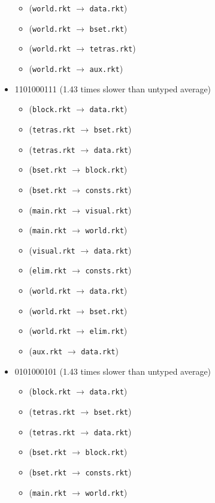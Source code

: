 \documentclass{article}
\newcommand{\mono}[1]{\texttt{#1}}
\begin{document}
\begin{itemize}
\begin{itemize}
  \item (\mono{world.rkt} $\rightarrow$ \mono{data.rkt})
  \item (\mono{world.rkt} $\rightarrow$ \mono{bset.rkt})
  \item (\mono{world.rkt} $\rightarrow$ \mono{tetras.rkt})
  \item (\mono{world.rkt} $\rightarrow$ \mono{aux.rkt})
  \end{itemize}
\item 1101000111 (1.43 times slower than untyped average)
  \begin{itemize}
  \item (\mono{block.rkt} $\rightarrow$ \mono{data.rkt})
  \item (\mono{tetras.rkt} $\rightarrow$ \mono{bset.rkt})
  \item (\mono{tetras.rkt} $\rightarrow$ \mono{data.rkt})
  \item (\mono{bset.rkt} $\rightarrow$ \mono{block.rkt})
  \item (\mono{bset.rkt} $\rightarrow$ \mono{consts.rkt})
  \item (\mono{main.rkt} $\rightarrow$ \mono{visual.rkt})
  \item (\mono{main.rkt} $\rightarrow$ \mono{world.rkt})
  \item (\mono{visual.rkt} $\rightarrow$ \mono{data.rkt})
  \item (\mono{elim.rkt} $\rightarrow$ \mono{consts.rkt})
  \item (\mono{world.rkt} $\rightarrow$ \mono{data.rkt})
  \item (\mono{world.rkt} $\rightarrow$ \mono{bset.rkt})
  \item (\mono{world.rkt} $\rightarrow$ \mono{elim.rkt})
  \item (\mono{aux.rkt} $\rightarrow$ \mono{data.rkt})
  \end{itemize}
\item 0101000101 (1.43 times slower than untyped average)
  \begin{itemize}
  \item (\mono{block.rkt} $\rightarrow$ \mono{data.rkt})
  \item (\mono{tetras.rkt} $\rightarrow$ \mono{bset.rkt})
  \item (\mono{tetras.rkt} $\rightarrow$ \mono{data.rkt})
  \item (\mono{bset.rkt} $\rightarrow$ \mono{block.rkt})
  \item (\mono{bset.rkt} $\rightarrow$ \mono{consts.rkt})
  \item (\mono{main.rkt} $\rightarrow$ \mono{world.rkt})

\end{itemize}
\end{itemize}
\end{document}
